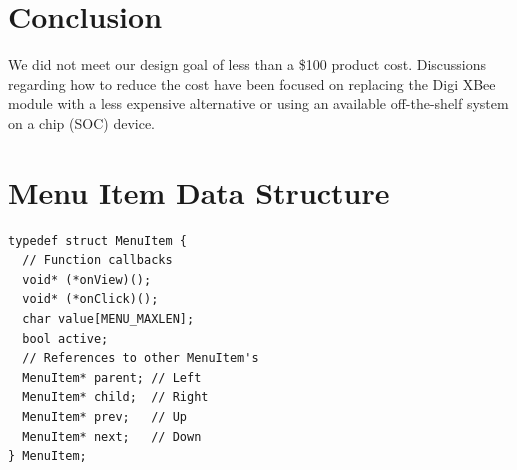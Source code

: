 \documentclass[journal,compsoc]{IEEEtran}
\begin{document}

\section{Conclusion}
We did not meet our design goal of less than a \$100 product cost. Discussions regarding how to reduce the cost have been focused on replacing the Digi XBee module with a less expensive alternative or using an available off-the-shelf system on a chip (SOC) device.

%
%
%
\appendices
\section{Menu Item Data Structure}
\label{MenuItem Code}
\begin{lstlisting}
typedef struct MenuItem {
  // Function callbacks
  void* (*onView)();
  void* (*onClick)();
  char value[MENU_MAXLEN];
  bool active;
  // References to other MenuItem's
  MenuItem* parent; // Left
  MenuItem* child;  // Right
  MenuItem* prev;   // Up
  MenuItem* next;   // Down
} MenuItem;
\end{lstlisting}
\end{document}
